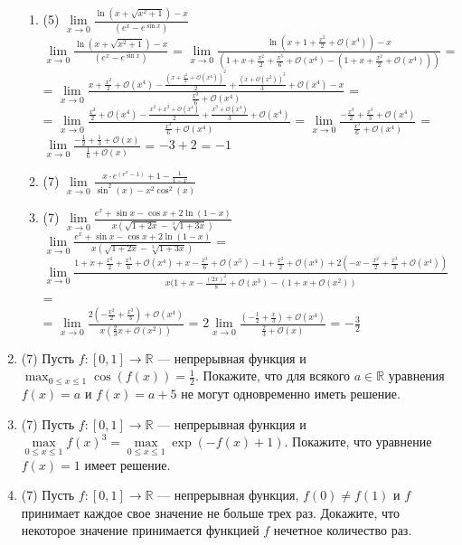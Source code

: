 \documentclass[a4paper]{article}
\begin{document}
\begin{enumerate}
\begin{enumerate}
        \item (5) $\lim\limits_{x\to 0}\frac{\ln (x+\sqrt{x^2+1})-x}{(e^x-e^{\sin x})}$\\
        $\lim\limits_{x\to 0}\frac{\ln (x+\sqrt{x^2+1})-x}{(e^x-e^{\sin x})}$ = 
        $\lim\limits_{x\to 0}\frac{\ln (x + 1 + \frac{x^2}{2} + \mathcal O(x^4))-x}{(1 + x + \frac{x^2}{2} + \frac{x^3}{6} + \mathcal O(x^4) - (1 + x + \frac{x^2}{2} + \mathcal O(x^4)))}$ =\\=
         $\lim\limits_{x\to 0}\frac{x + \frac{x^2}{2} + \mathcal O(x^4)  - \frac{(x + \frac{x^2}{2} + \mathcal O(x^4))^2}{2} + \frac{(x + \mathcal O(x^2))^3}{3} + \mathcal O(x^4)-x}{\frac{x^3}{6} + \mathcal O(x^4)}$ =\\=
         $\lim\limits_{x\to 0}\frac{\frac{x^2}{2} + \mathcal O(x^4)  - \frac{x^2 + x^3 + \mathcal O(x^4)}{2} + \frac{x^3 + \mathcal O(x^4)}{3} + \mathcal O(x^4)}{\frac{x^3}{6} + \mathcal O(x^4)}$ = 
         $\lim\limits_{x\to 0}\frac{-\frac{x^3}{2} + \frac{x^3}{3} + \mathcal O(x^4)}{\frac{x^3}{6} + \mathcal O(x^4)}$ = 
         $\lim\limits_{x\to 0}\frac{-\frac{1}{2} + \frac{1}{3} + \mathcal O(x)}{\frac{1}{6} + \mathcal O(x)}$ = 
         $-3 + 2$ = $-1$
        \item (7) $\lim\limits_{x\to 0}\frac{x\cdot e^{(e^x-1)}+1-\frac{1}{1-x}}{\sin^2(x)-x^2\cos^2(x)}$
        \item (7) $\lim\limits_{x\to 0} \frac{e^x+\sin x - \cos x + 2\ln(1-x)}{x(\sqrt{1+2x}-\sqrt[3]{1+3x})}$\\
        $\lim\limits_{x\to 0} \frac{e^x+\sin x - \cos x + 2\ln(1-x)}{x(\sqrt{1+2x}-\sqrt[3]{1+3x})}$ = $\lim\limits_{x\to 0} \frac{1 + x + \frac{x^2}{2} + \frac{x^3}{6} + \mathcal O(x^4) + x - \frac{x^3}{6} + \mathcal O(x^5) - 1 + \frac{x^2}{2} + \mathcal O(x^4) + 2(-x - \frac{x^2}{2} + \frac{x^3}{3} + \mathcal O(x^4))}{x(1 + x - \frac{(2x)^2}{8} + \mathcal O(x^3) - (1 + x + \mathcal O(x^2))}$ =\\=
         $\lim\limits_{x\to 0} \frac{2(- \frac{x^2}{2} + \frac{x^3}{3}) + \mathcal O(x^4) }{x(\frac{2}{3}x + \mathcal O(x^2))}$ = 
         $2\lim\limits_{x\to 0} \frac{(- \frac{1}{2} + \frac{x}{3}) + \mathcal O(x^4) }{\frac{2}{3} + \mathcal O(x)}$ = $-\frac{3}{2}$
    \end{enumerate}
    
    \item (7) Пусть $f:[0,1]\to \mathbb R$ --- непрерывная функция и $\max_{0\leq x\leq 1}\cos (f(x))=\frac{1}{2}$. Покажите, что для всякого $a\in \mathbb R$ уравнения $f(x) = a$ и $f(x) = a + 5$ не могут одновременно иметь решение.

\item (7) Пусть $f:[0,1]\to \mathbb R$ --- непрерывная функция и $\max\limits_{0\leq x\leq 1}f(x)^3 = \max\limits_{0\leq x\leq 1}\exp(-f(x) + 1)$. Покажите, что уравнение $f(x) = 1$ имеет решение.

\item (7) Пусть  $f:[0,1]\to \mathbb R$ --- непрерывная функция, $f(0)\neq f(1)$ и $f$ принимает каждое свое значение не больше трех раз. Докажите, что некоторое значение принимается функцией $f$ нечетное количество раз.
    
    
    
\end{enumerate}
\end{document}
